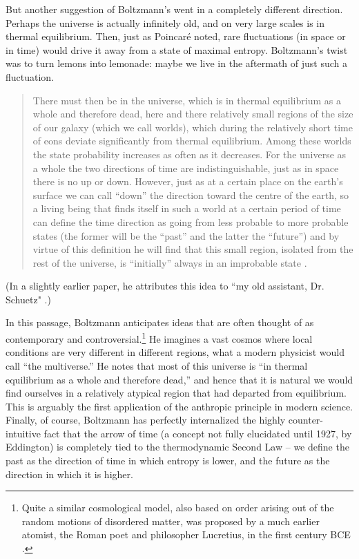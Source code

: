 \documentclass[12pt,letterpaper]{article}
\begin{document}
But another suggestion of Boltzmann's went in a completely different direction.
Perhaps the universe is actually infinitely old, and on very large scales is in thermal equilibrium.
Then, just as Poincar\'e noted, rare fluctuations (in space or in time) would drive it away from a state of maximal entropy.
Boltzmann's twist was to turn lemons into lemonade: maybe we live in the aftermath of just such a fluctuation.
\begin{quote}
There must then be in the universe, which is in thermal
equilibrium as a whole and therefore dead, here and there relatively small regions
of the size of our galaxy (which we call worlds), which during the relatively short
time of eons deviate significantly from thermal equilibrium.  Among these worlds the state
probability increases as often as it decreases.  For the universe as a whole the two
directions of time are indistinguishable, just as in space there is no up or down.
However, just as at a certain place on the earth's surface we can call ``down'' the direction 
toward the centre of the earth, so a living being that finds itself in such a world at a certain
period of time can define the time direction as going from less probable to more probable
states (the former will be the ``past'' and the latter the ``future'') and by virtue of this
definition he will find that this small region, isolated from the rest of the universe, is
``initially'' always in an improbable state \cite{boltzmannvzermelo2}.
\end{quote}
(In a slightly earlier paper, he attributes this idea to ``my old assistant, Dr. Schuetz" \cite{boltzmannschuetz}.)

In this passage, Boltzmann anticipates ideas that are often thought of as contemporary and controversial.\footnote{Quite a similar cosmological model, also based on order arising out of the random motions of disordered matter, was proposed by a much earlier atomist, the Roman poet and philosopher Lucretius, in the first century BCE \cite{lucretius}.}
He imagines a vast cosmos where local conditions are very different in different regions, what a modern physicist would call ``the multiverse.''
He notes that most of this universe is ``in thermal equilibrium as a whole and therefore dead,'' and hence that it is natural we would find ourselves in a relatively atypical region that had departed from equilibrium. 
This is arguably the first application of the anthropic principle in modern science.
Finally, of course, Boltzmann has perfectly internalized the highly counter-intuitive fact that the arrow of time (a concept not fully elucidated until 1927, by Eddington) is completely tied to the thermodynamic Second Law -- we define the past as the direction of time in which entropy is lower, and the future as the direction in which it is higher.
\end{document}
